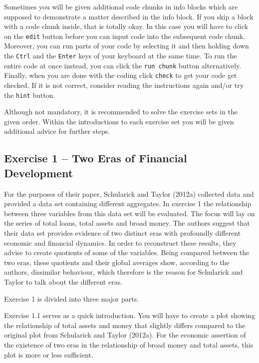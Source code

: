\documentclass[a4paper,11pt,abstract=on]{scrartcl}
\begin{document}
{\begin{spacing}{1.3}
Sometimes you will be given additional code chunks in info blocks which
are supposed to demonstrate a matter described in the info block. If you
skip a block with a code chunk inside, that is totally okay. In this
case you will have to click on the \texttt{edit} button before you can
input code into the subsequent code chunk. Moreover, you can run parts
of your code by selecting it and then holding down the \texttt{Ctrl} and
the \texttt{Enter} keys of your keyboard at the same time. To run the
entire code at once instead, you can click the \texttt{run chunk} button
alternatively. Finally, when you are done with the coding click
\texttt{check} to get your code get checked. If it is not correct,
consider reading the instructions again and/or try the \texttt{hint}
button.
\end{spacing}
Although not mandatory, it is recommended to solve the exercise sets in the given order. Within
the introductions to each exercise set you will be given additional 
advice for further steps.

\eject

\subsection{\sf Exercise 1 -- Two Eras of Financial Development}\label{exercise-1-overview}

For the purposes of their paper, Schularick and Taylor (2012a) collected
data and provided a data set containing different aggregates. In
exercise 1 the relationship between three variables from this data set
will be evaluated. The focus will lay on the series of total loans,
total assets and broad money. The authors suggest that their data set
provides evidence of two distinct eras with profoundly different
economic and financial dynamics. In order to reconstruct these
results, they advise to create quotients of some of the variables. Being
compared between the two eras, these quotients and their global averages
show, according to the authors, dissimilar behaviour, which therefore is
the reason for Schularick and Taylor to talk about the different eras.

Exercise 1 is divided into three major parts.

Exercise 1.1 serves as a quick introduction. You will have to create a
plot showing the relationship of total assets and money that slightly
differs compared to the original plot from Schularick and Taylor
(2012a). For the economic assertion of the existence of two eras in
the relationship of broad money and total assets, this plot is more or
less sufficient.

}
\end{document}

